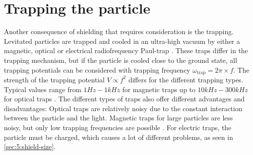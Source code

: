 \section{Trapping the particle}\label{sec:4:trapping}
Another consequence of shielding that requires consideration is the trapping. Levitated particles are trapped and cooled in an ultra-high vacuum by either a magnetic, optical or electrical radiofrequency Paul-trap \cite{GonzalezBallestero_2021}.
These traps differ in the trapping mechanism, but if the particle is cooled close to the ground state, all trapping potentials can be considered  with trapping frequency $\omega_\mathrm{trap} = 2\pi \times f$.
The strength of the trapping potential $V \propto f^2$ differs for the different trapping types. Typical values range from $1\si{Hz}-1\si{kHz}$ for magnetic traps \cite{Slezak_2018,GonzalezBallestero_2021} up to $10\si{kHz}-300\si{kHz}$ for optical traps \cite{GonzalezBallestero_2021}. 
The different types of traps also offer different advantages and disadvantages: Optical traps are relatively noisy due to the constant interaction between the particle and the light. Magnetic traps for large particles are less noisy, but only low trapping frequencies are possible \cite{GonzalezBallestero_2021}. 
For electric traps, the particle must be charged, which causes a lot of different problems, as seen in \cref{sec:5:shield-size}.

